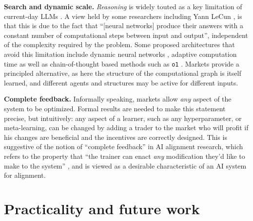 \textbf{Search and dynamic scale.} \emph{Reasoning} is widely touted as a key limitation of current-day LLMs \cite{huangReasoningLargeLanguage2023,mclauAISearchBitterer2024}. A view held by some researchers including Yann LeCun \cite{yannlecunMachinesThatCan2023}, is that this is due to the fact that ``[neural networks] produce their answers with a constant number of computational steps between input and output'', independent of the complexity required by the problem. Some proposed architectures that avoid this limitation include dynamic neural networks \cite{hanDynamicNeuralNetworks2021}, adaptive computation time \cite{gravesAdaptiveComputationTime2017} as well as chain-of-thought based methods such as \texttt{o1} \cite{openaiLearningReasonLLMs2024}. Markets provide a principled alternative, as here the structure of the computational graph is itself learned, and different agents and structures may be active for different inputs.



\textbf{Complete feedback.} Informally speaking, markets allow \emph{any} aspect of the system to be optimized. Formal results are needed to make this statement precise, but intuitively: any aspect of a learner, such as any hyperparameter, or meta-learning, can be changed by adding a trader to the market who will profit if his changes are beneficial and the incentives are correctly designed. This is suggestive of the notion of ``complete feedback'' in AI alignment research, which refers to the property that ``the trainer can enact \emph{any} modification they'd like to make to the system'' \cite{demskiCompleteFeedback2024}, and is viewed as a desirable characteristic of an AI system for alignment. %

\section{Practicality and future work}

